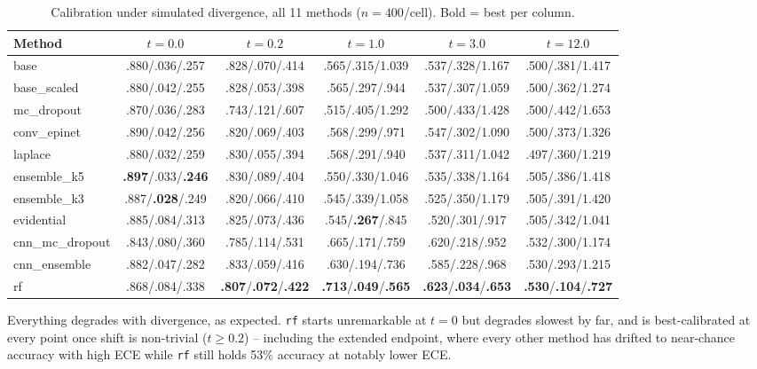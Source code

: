 \begin{table}[t]
\centering
\caption{Calibration under simulated divergence, all 11 methods
($n{=}400$/cell). Bold = best per column.}
\label{tab:alisim-calibration}
\begin{tabular}{lccccc}
\toprule
Method & $t{=}0.0$ & $t{=}0.2$ & $t{=}1.0$ & $t{=}3.0$ & $t{=}12.0$ \\
\midrule
base             & .880/.036/.257 & .828/.070/.414 & .565/.315/1.039 & .537/.328/1.167 & .500/.381/1.417 \\
base\_scaled     & .880/.042/.255 & .828/.053/.398 & .565/.297/.944  & .537/.307/1.059 & .500/.362/1.274 \\
mc\_dropout      & .870/.036/.283 & .743/.121/.607 & .515/.405/1.292 & .500/.433/1.428 & .500/.442/1.653 \\
conv\_epinet     & .890/.042/.256 & .820/.069/.403 & .568/.299/.971  & .547/.302/1.090 & .500/.373/1.326 \\
laplace          & .880/.032/.259 & .830/.055/.394 & .568/.291/.940  & .537/.311/1.042 & .497/.360/1.219 \\
ensemble\_k5     & \textbf{.897}/.033/\textbf{.246} & .830/.089/.404 & .550/.330/1.046 & .535/.338/1.164 & .505/.386/1.418 \\
ensemble\_k3     & .887/\textbf{.028}/.249 & .820/.066/.410 & .545/.339/1.058 & .525/.350/1.179 & .505/.391/1.420 \\
evidential       & .885/.084/.313 & .825/.073/.436 & .545/\textbf{.267}/.845 & .520/.301/.917 & .505/.342/1.041 \\
cnn\_mc\_dropout & .843/.080/.360 & .785/.114/.531 & .665/.171/.759  & .620/.218/.952 & .532/.300/1.174 \\
cnn\_ensemble    & .882/.047/.282 & .833/.059/.416 & .630/.194/.736  & .585/.228/.968 & .530/.293/1.215 \\
rf               & .868/.084/.338 & \textbf{.807}/\textbf{.072}/\textbf{.422} & \textbf{.713}/\textbf{.049}/\textbf{.565} & \textbf{.623}/\textbf{.034}/\textbf{.653} & \textbf{.530}/\textbf{.104}/\textbf{.727} \\
\bottomrule
\end{tabular}
\end{table}

Everything degrades with divergence, as expected. \texttt{rf} starts
unremarkable at $t{=}0$ but degrades slowest by far, and is best-calibrated
at every point once shift is non-trivial ($t{\geq}0.2$) -- including the
extended endpoint, where every other method has drifted to near-chance
accuracy with high ECE while \texttt{rf} still holds 53\% accuracy at
notably lower ECE.

